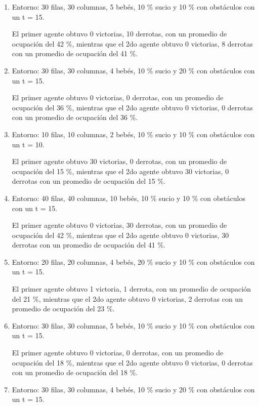 \documentclass[a4paper,10pt,twocolumn]{article}
\begin{document}
	\begin{enumerate}
		\item Entorno: 30 filas, 30 columnas, 5 bebés, 10 \% sucio y 10 \% con obstáculos con un t = 15. 
		
		
		El primer agente obtuvo 0 victorias, 10 derrotas, con un promedio de ocupación del 42 \%, mientras que el 2do agente obtuvo 0 victorias, 8 derrotas con un promedio de ocupación del 41 \%.
		
		\item Entorno: 30 filas, 30 columnas, 4 bebés, 10 \% sucio y 20 \% con obstáculos con un t = 15. 
		
		
		El primer agente obtuvo 0 victorias, 0 derrotas, con un promedio de ocupación del 36 \%, mientras que el 2do agente obtuvo 0 victorias, 0 derrotas con un promedio de ocupación del 36 \%.
		
		\item Entorno: 10 filas, 10 columnas, 2 bebés, 10 \% sucio y 10 \% con obstáculos con un t = 10. 
		
		
		El primer agente obtuvo 30 victorias, 0 derrotas, con un promedio de ocupación del 15 \%, mientras que el 2do agente obtuvo 30 victorias, 0 derrotas con un promedio de ocupación del 15 \%.
		
		\item Entorno: 40 filas, 40 columnas, 10 bebés, 10 \% sucio y 10 \% con obstáculos con un t = 15. 
		
		
		El primer agente obtuvo 0 victorias, 30 derrotas, con un promedio de ocupación del 42 \%, mientras que el 2do agente obtuvo 0 victorias, 30 derrotas con un promedio de ocupación del 41 \%.
		
		\item Entorno: 20 filas, 20 columnas, 4 bebés, 20 \% sucio y 10 \% con obstáculos con un t = 15. 
		
		
		El primer agente obtuvo 1 victoria, 1 derrota, con un promedio de ocupación del 21 \%, mientras que el 2do agente obtuvo 0 victorias, 2 derrotas con un promedio de ocupación del 23 \%.
		
			\item Entorno: 30 filas, 30 columnas, 5 bebés, 10 \% sucio y 10 \% con obstáculos con un t = 15. 
		
		
		El primer agente obtuvo 0 victorias, 0 derrotas, con un promedio de ocupación del 18 \%, mientras que el 2do agente obtuvo 0 victorias, 0 derrotas con un promedio de ocupación del 18 \%.
		
		\item Entorno: 30 filas, 30 columnas, 4 bebés, 10 \% sucio y 20 \% con obstáculos con un t = 15. 
		

\end{enumerate}
\end{document}
